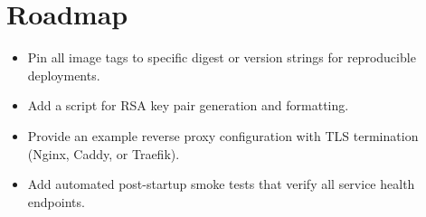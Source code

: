 \section{Roadmap}

\begin{itemize}
  \item Pin all image tags to specific digest or version strings for reproducible deployments.
  \item Add a  script for RSA key pair generation and formatting.
  \item Provide an example reverse proxy configuration with TLS termination (Nginx, Caddy, or Traefik).
  \item Add automated post-startup smoke tests that verify all service health endpoints.
\end{itemize}
